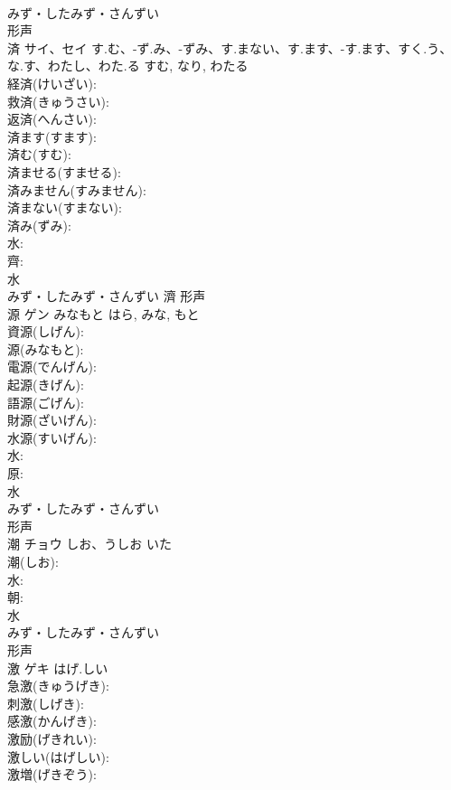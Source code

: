 \documentclass[8pt]{extreport}
\begin{document}
\begin{CJK}{UTF8}{min}
\\	みず・したみず・さんずい	
\\	形声 
\\	済	サイ、セイ	す.む、-ず.み、-ずみ、す.まない、す.ます、-す.ます、すく.う、な.す、わたし、わた.る	すむ, なり, わたる	
\\	経済(けいざい): 
\\	救済(きゅうさい): 
\\	返済(へんさい): 
\\	済ます(すます): 
\\	済む(すむ): 
\\	済ませる(すませる): 
\\	済みません(すみません): 
\\	済まない(すまない): 
\\	済み(ずみ): 
\\	水: 
\\	齊: 
\\	水	
\\	みず・したみず・さんずい	濟	形声 
\\	源	ゲン	みなもと	はら, みな, もと	
\\	資源(しげん): 
\\	源(みなもと): 
\\	電源(でんげん): 
\\	起源(きげん): 
\\	語源(ごげん): 
\\	財源(ざいげん): 
\\	水源(すいげん): 
\\	水: 
\\	原: 
\\	水	
\\	みず・したみず・さんずい	
\\	形声 
\\	潮	チョウ	しお、うしお	いた	
\\	潮(しお): 
\\	水: 
\\	朝: 
\\	水	
\\	みず・したみず・さんずい	
\\	形声 
\\	激	ゲキ	はげ.しい		
\\	急激(きゅうげき): 
\\	刺激(しげき): 
\\	感激(かんげき): 
\\	激励(げきれい): 
\\	激しい(はげしい): 
\\	激増(げきぞう): 

\end{CJK}
\end{document}
